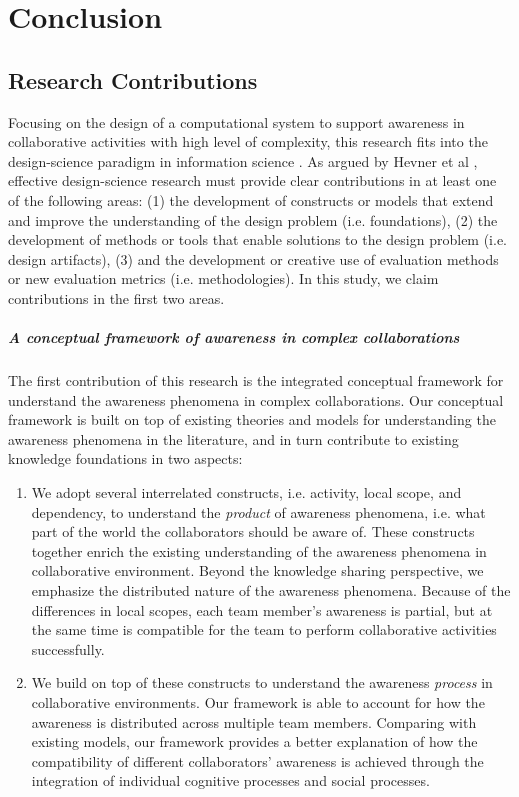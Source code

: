 \graphicspath{{Figures/}}

\chapter{Conclusion} %
\label{cha:conclusion}
\section{Research Contributions} %
\label{sec:contributions}
Focusing on the design of a computational system to support awareness in collaborative activities with high level of complexity, this research fits into the design-science paradigm in information science \cite{Hevner2004}. As argued by Hevner et al \cite{Hevner2004}, effective design-science research must provide clear contributions in at least one of the following areas: (1) the development of constructs or models that extend and improve the understanding of the design problem (i.e. foundations), (2) the development of methods or tools that enable solutions to the design problem (i.e. design artifacts), (3) and the development or creative use of evaluation methods or new evaluation metrics (i.e. methodologies). In this study, we claim contributions in the first two areas. 

\paragraph*{A conceptual framework of awareness in complex collaborations} %
\label{par:a_conceptual_framework_of_awareness_in_complex_collaborations}
The first contribution of this research is the integrated conceptual framework for understand the awareness phenomena in complex collaborations. Our conceptual framework is built on top of existing theories and models for understanding the awareness phenomena in the literature, and in turn contribute to existing knowledge foundations in two aspects:

\begin{enumerate}
	\item We adopt several interrelated constructs, i.e. activity, local scope, and dependency, to understand the \emph{product} of awareness phenomena, i.e. what part of the world the collaborators should be aware of. These constructs together enrich the existing understanding of the awareness phenomena in collaborative environment. Beyond the knowledge sharing perspective, we emphasize the distributed nature of the awareness phenomena. Because of the differences in local scopes, each team member's awareness is partial, but at the same time is compatible for the team to perform collaborative activities successfully.
	\item We build on top of these constructs to understand the awareness \emph{process} in collaborative environments. Our framework is able to account for how the awareness is distributed across multiple team members. Comparing with existing models, our framework provides a better explanation of how the compatibility of different collaborators' awareness is achieved through the integration of individual cognitive processes and social processes.
\end{enumerate}


